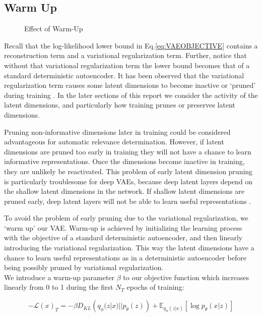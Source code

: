 \documentclass{article} %
\numberwithin{figure}{section}
\renewcommand{\L}{\mathcal{L}}
\begin{document}
\subsection{Warm Up}
\begin{wrapfigure}{l}{0.5\textwidth}
    \resizebox{\linewidth}{!}{}
    \caption{Effect of Warm-Up}
    \label{fig:wucost}
\end{wrapfigure}
Recall that the log-likelihood lower bound in Eq.\ref{eq:VAEOBJECTIVE} contains a reconstruction term and a variational regularization term. Further, notice that without that variational regularization term the lower bound becomes that of a standard deterministic autoencoder. It has been observed that the variational regularization term causes some latent dimensions to become inactive or `pruned' during training \cite{MacKay2001, Burda2016}. In the later sections of this report we consider the activity of the latent dimensions, and particularly how training prunes or preserves latent dimensions.
\par Pruning non-informative dimensions later in training could be considered advantageous for automatic relevance determination. However, if latent dimensions are pruned too early in training they will not have a chance to learn informative representations. Once the dimensions become inactive in training, they are unlikely be reactivated. This problem of early latent dimension pruning is particularly troublesome for deep VAEs, because deep latent layers depend on the shallow latent dimensions in the network. If shallow latent dimensions are pruned early,  deep latent layers will not be able to learn useful representations \cite{Sonderby2016}.
\par To avoid the problem of early pruning due to the variational regularization, we `warm up' our VAE. Warm-up is achieved by initializing the learning process with the objective of a standard deterministic autoencoder, and then linearly introducing the variational regularization. This way the latent dimensions have a chance to learn useful representations as in a deterministic autoencoder before being possibly pruned by variational regularization.\\ We introduce a warm-up parameter $\beta$ to our objective function which increases linearly from 0 to 1 during the first $N_T$ epochs of training:

\begin{equation}
    -\L(x)_T=-\beta D_{KL}\left(q_\phi(z|x)||p_\theta(z)\right)+\mathbb{E}_{q_\phi(z|x)}\left[\log{p_\theta(x|z)}\right]
\end{equation}
\end{document}
